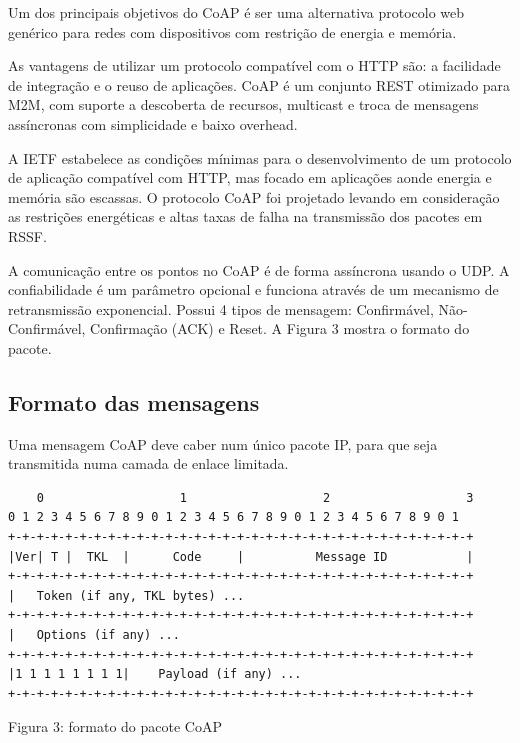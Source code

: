 Um dos principais objetivos do CoAP \'e ser uma alternativa protocolo web gen\'erico para redes com dispositivos com restri\c{c}\~ao de energia e mem\'oria.

As vantagens de utilizar um protocolo compat\'ivel com o HTTP s\~ao: a facilidade de integra\c{c}\~ao e o reuso de aplica\c{c}\~oes. CoAP \'e um conjunto REST otimizado para M2M, com suporte a descoberta de recursos, multicast e troca de mensagens ass\'incronas com simplicidade e baixo overhead.

A IETF estabelece as condi\c{c}\~oes m\'inimas para o desenvolvimento de um protocolo de aplica\c{c}\~ao compat\'ivel com HTTP, mas focado em aplica\c{c}\~oes aonde energia e mem\'oria s\~ao escassas. O protocolo CoAP foi projetado levando em considera\c{c}\~ao as restri\c{c}\~oes energ\'eticas e altas taxas de falha na transmiss\~ao dos pacotes em RSSF.

A comunica\c{c}\~ao entre os pontos no CoAP \'e de forma ass\'incrona usando o UDP. A confiabilidade \'e um par\^ametro opcional e funciona atrav\'es de um mecanismo de retransmiss\~ao exponencial. Possui 4 tipos de mensagem: Confirm\'avel, N\~ao-Confirm\'avel, Confirma\c{c}\~ao (ACK) e Reset. A Figura 3 mostra o formato do pacote.

\subsection{Formato das mensagens}
Uma mensagem CoAP deve caber num \'unico pacote IP, para que seja transmitida numa camada de enlace limitada.
\begin{footnotesize}
    \begin{verbatim}
    0                   1                   2                   3
0 1 2 3 4 5 6 7 8 9 0 1 2 3 4 5 6 7 8 9 0 1 2 3 4 5 6 7 8 9 0 1
+-+-+-+-+-+-+-+-+-+-+-+-+-+-+-+-+-+-+-+-+-+-+-+-+-+-+-+-+-+-+-+-+
|Ver| T |  TKL  |      Code     |          Message ID           |
+-+-+-+-+-+-+-+-+-+-+-+-+-+-+-+-+-+-+-+-+-+-+-+-+-+-+-+-+-+-+-+-+
|   Token (if any, TKL bytes) ...
+-+-+-+-+-+-+-+-+-+-+-+-+-+-+-+-+-+-+-+-+-+-+-+-+-+-+-+-+-+-+-+-+
|   Options (if any) ...
+-+-+-+-+-+-+-+-+-+-+-+-+-+-+-+-+-+-+-+-+-+-+-+-+-+-+-+-+-+-+-+-+
|1 1 1 1 1 1 1 1|    Payload (if any) ...
+-+-+-+-+-+-+-+-+-+-+-+-+-+-+-+-+-+-+-+-+-+-+-+-+-+-+-+-+-+-+-+-+
    \end{verbatim}\end{footnotesize}
\begin{center}Figura 3: formato do pacote CoAP  \cite{draft-ietf-core-coap-18}\end{center}


